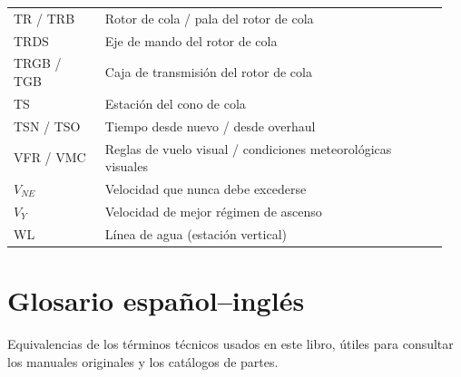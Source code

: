 {\begin{longtable}{@{}>{\raggedright\arraybackslash}p{0.2\linewidth}>{\raggedright\arraybackslash}p{0.75\linewidth}@{}}
TR / TRB & Rotor de cola / pala del rotor de cola \\
TRDS & Eje de mando del rotor de cola \\
TRGB / TGB & Caja de transmisión del rotor de cola \\
TS & Estación del cono de cola \\
TSN / TSO & Tiempo desde nuevo / desde overhaul \\
VFR / VMC & Reglas de vuelo visual / condiciones meteorológicas visuales \\
$V_{NE}$ & Velocidad que nunca debe excederse \\
$V_Y$ & Velocidad de mejor régimen de ascenso \\
WL & Línea de agua (estación vertical) \\
\end{longtable}
}

\section{Glosario español--inglés}

Equivalencias de los términos técnicos usados en este libro, útiles para consultar los manuales originales y los catálogos de partes.

